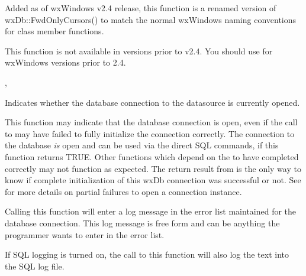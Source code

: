 
Added as of wxWindows v2.4 release, this function is a renamed version of
wxDb::FwdOnlyCursors() to match the normal wxWindows naming conventions for
class member functions.

This function is not available in versions prior to v2.4.  You should
use  for wxWindows
versions prior to 2.4.


, 

\label{wxdbisopen}


Indicates whether the database connection to the datasource is currently
opened.


This function may indicate that the database connection is open, even if
the call to  may have failed to fully
initialize the connection correctly.  The connection to the database
{\it is} open and can be used via the direct SQL commands, if this
function returns TRUE.  Other functions which depend on the
 to have completed correctly may not function
as expected.  The return result from  is the
only way to know if complete initialization of this wxDb connection was
successful or not.  See  for more details on
partial failures to open a connection instance.

\label{wxdblogerror}




Calling this function will enter a log message in the error list maintained
for the database connection.  This log message is free form and can be
anything the programmer wants to enter in the error list.

If SQL logging is turned on, the call to this function will also log the
text into the SQL log file.


